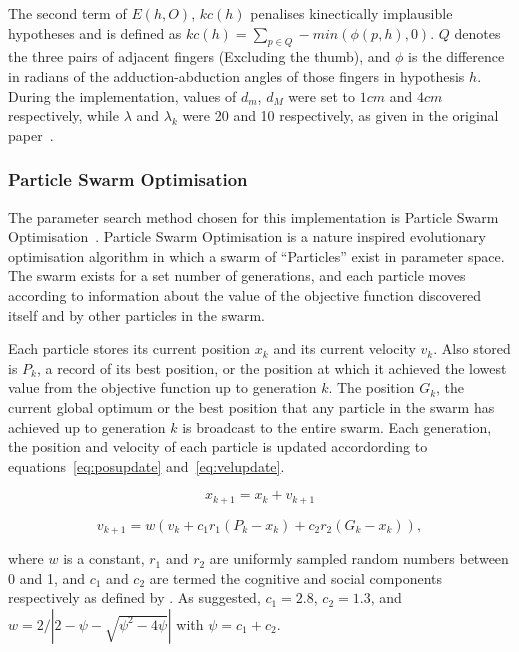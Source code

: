 \documentclass[10pt,a4paper,notitlepage,twocolumn]{report}
\begin{document}
The second term of $E(h, O)$, $kc(h)$  penalises kinectically implausible hypotheses and is defined as $kc(h) = \sum_{p \in Q} - min(\phi(p, h), 0)$.  $Q$ denotes the three pairs of adjacent fingers (Excluding the thumb), and $\phi$ is the difference in radians of the adduction-abduction angles of those fingers in hypothesis $h$.  During the implementation, values of $d_m$, $d_M$ were set to $1cm$ and $4cm$ respectively, while $\lambda$ and $\lambda_k$ were 20 and 10 respectively, as given in the original paper~\cite{bmvc2011oikonom}.

    \subsubsection{Particle Swarm Optimisation}

  The parameter search method chosen for this implementation is Particle Swarm Optimisation~\cite{kennedy1995particle}.  Particle Swarm Optimisation is a nature inspired evolutionary optimisation algorithm in which a swarm of ``Particles'' exist in parameter space. The swarm exists for a set number of generations, and each particle moves according to information about the value of the objective function discovered itself and by other particles in the swarm.

  Each particle stores its current position $x_k$ and its current velocity $v_k$.  Also stored is $P_k$, a record of its best position, or the position at which it achieved the lowest value from the objective function up to generation $k$.  The position $G_k$, the current global optimum or the best position that any particle in the swarm has achieved up to generation $k$ is broadcast to the entire swarm.  Each generation, the position and velocity of each particle is updated accordording to equations~\ref{eq:posupdate} and~\ref{eq:velupdate}.

\begin{equation}
  \label{eq:posupdate}
  x_{k+1} = x_k + v_{k+1}
\end{equation}

\begin{equation}
  \label{eq:velupdate}
  v_{k+1} = w(v_k + c_1r_1(P_k - x_k) + c_2r_2(G_k - x_k)), 
\end{equation}

where $w$ is a constant, $r_1$ and $r_2$ are uniformly sampled random numbers between 0 and 1, and $c_1$ and $c_2$ are termed the cognitive and social components respectively as defined by .  As suggested, $c_1 = 2.8$, $c_2 = 1.3$, and $w = 2 / \left | 2 - \psi - \sqrt{\psi^2 - 4 \psi} \right |$ with $\psi = c_1 + c_2$.
\end{document}
